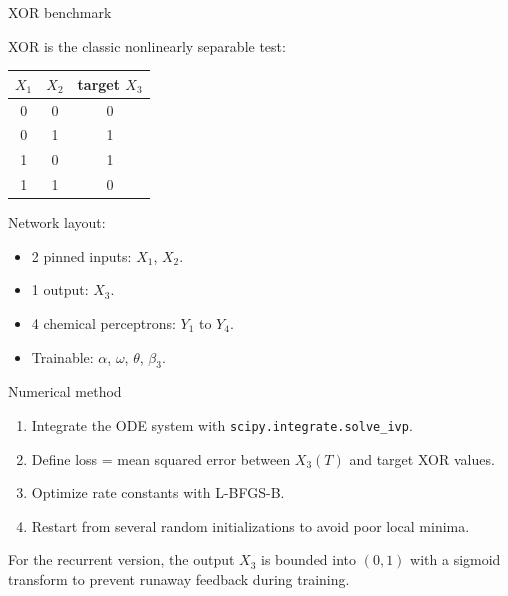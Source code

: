 \documentclass[aspectratio=169,11pt]{beamer}
\begin{document}
\begin{frame}{XOR benchmark}

XOR is the classic nonlinearly separable test:

\vspace{0.3cm}
\begin{table}
\centering
\begin{tabular}{cc|c}
\toprule
$X_1$ & $X_2$ & \textbf{target} $X_3$ \\
\midrule
0 & 0 & 0 \\
0 & 1 & 1 \\
1 & 0 & 1 \\
1 & 1 & 0 \\
\bottomrule
\end{tabular}
\end{table}

\vspace{0.3cm}
Network layout:
\begin{itemize}
    \item 2 pinned inputs: $X_1$, $X_2$.
    \item 1 output: $X_3$.
    \item 4 chemical perceptrons: $Y_1$ to $Y_4$.
    \item Trainable: $\alpha$, $\omega$, $\theta$, $\beta_3$.
\end{itemize}

\end{frame}

\begin{frame}{Numerical method}

\begin{enumerate}
    \item Integrate the ODE system with \texttt{scipy.integrate.solve\_ivp}.
    \item Define loss = mean squared error between $X_3(T)$ and target XOR values.
    \item Optimize rate constants with L-BFGS-B.
    \item Restart from several random initializations to avoid poor local minima.
\end{enumerate}

\vspace{0.3cm}
For the recurrent version, the output $X_3$ is bounded into $(0,1)$ with a sigmoid transform to prevent runaway feedback during training.

\end{frame}
\end{document}
